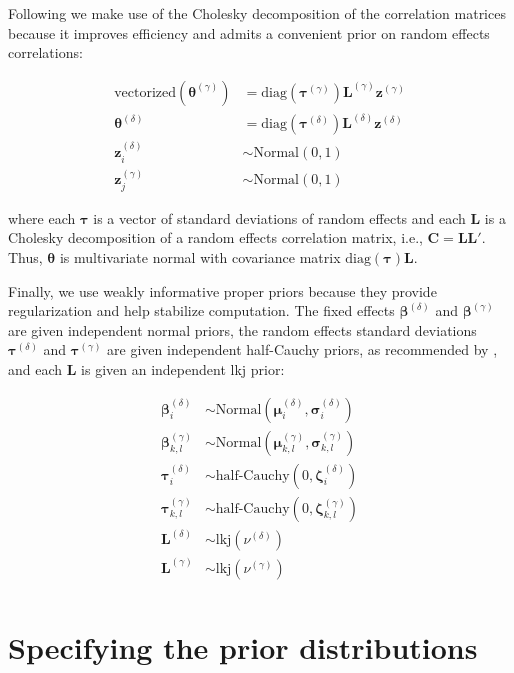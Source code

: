 \documentclass[a4paper,man,apacite,floatsintext]{apa6}
\begin{document}
Following  we make use of the Cholesky
decomposition of the correlation matrices because it improves
efficiency and admits a convenient prior on random effects
correlations:

\begin{align*}
  \text{vectorized}(\bm{\theta}^{(\gamma)}) &= \text{diag}(\bm{\tau}^{(\gamma)}) \bm{L}^{(\gamma)} \bm{z}^{(\gamma)} \\
  \bm{\theta}^{(\delta)} &= \text{diag}(\bm{\tau}^{(\delta)}) \bm{L}^{(\delta)} \bm{z}^{(\delta)} \\
  \bm{z}^{(\delta)}_i &\sim \text{Normal}(0, 1) \\
  \bm{z}^{(\gamma)}_j &\sim \text{Normal}(0, 1)
\end{align*}

\noindent where each $\bm{\tau}$ is a vector of standard deviations of
random effects and each $\bm{L}$ is a Cholesky decomposition of a
random effects correlation matrix, i.e., $\bm{C} = \bm{L}
\bm{L}'$. Thus, $\bm{\theta}$ is multivariate normal with covariance
matrix $\text{diag}(\bm{\tau}) \bm{L}$.

Finally, we use weakly informative proper priors because they provide
regularization and help stabilize computation. The fixed effects
$\bm{\beta}^{(\delta)}$ and $\bm{\beta}^{(\gamma)}$ are given
independent normal priors, the random effects standard deviations
$\bm{\tau}^{(\delta)}$ and $\bm{\tau}^{(\gamma)}$ are given
independent half-Cauchy priors, as recommended by
, and each $\bm{L}$ is given an independent lkj
prior:

\begin{align*}
  \bm{\beta}^{(\delta)}_i &\sim \text{Normal}(\bm{\mu}^{(\delta)}_i, \bm{\sigma}^{(\delta)}_i) \\
  \bm{\beta}^{(\gamma)}_{k,l} &\sim \text{Normal}(\bm{\mu}^{(\gamma)}_{k,l}, \bm{\sigma}^{(\gamma)}_{k,l}) \\
  \bm{\tau}^{(\delta)}_i &\sim \text{half-Cauchy}(0, \bm{\zeta}^{(\delta)}_i) \\
  \bm{\tau}^{(\gamma)}_{k,l} &\sim \text{half-Cauchy}(0, \bm{\zeta}^{(\gamma)}_{k,l}) \\
  \bm{L}^{(\delta)} &\sim \text{lkj}(\nu^{(\delta)}) \\
  \bm{L}^{(\gamma)} &\sim \text{lkj}(\nu^{(\gamma)}) \\
\end{align*}

\section{Specifying the prior distributions}
\end{document}
